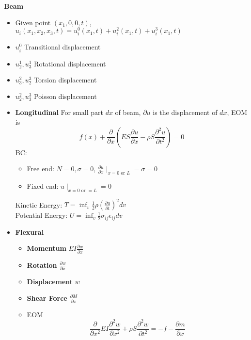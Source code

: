 \documentclass{article}
\begin{document}
\begin{multicols*}{2}
  \noindent\textbf{Beam}
  \begin{itemize}
  \item Given point $(x_1, 0, 0, t)$, $u_i(x_1, x_2, x_3, t) = u_i^0(x_1,t) + u_i^2(x_1,t) + u_i^3(x_1,t)$
  \item $u_i^0$ Transitional displacement
  \item $u_2^1, u_3^1$ Rotational displacement
  \item $u_3^2, u_2^3$ Torsion displacement
  \item $u_2^2, u_3^3$ Poisson displacement
  \item \textbf{Longitudinal} For small part $dx$ of beam, $\partial u$ is the displacement of $dx$, EOM is
    \begin{equation*}
      f(x) + \frac{\partial}{\partial x}(ES\frac{\partial u}{\partial x} -\rho S\frac{\partial^2 u}{\partial t^2}) = 0
    \end{equation*}
    BC:
    \begin{itemize}
    \item Free end: $N=0, \sigma=0$, $\frac{\partial u}{\partial x}\mid_{x=0 \text{ or } L} = \sigma = 0$
    \item Fixed end: $u\mid_{x=0 \text{ or } = L} = 0$
    \end{itemize}
    Kinetic Energy: $T = \inf_v \frac{1}{2} \rho (\frac{\partial u}{\partial t})^2 dv$\\
    Potential Energy: $U = \inf_v \frac{1}{2}\sigma_{ij} \epsilon_{ij} dv$

  \item\textbf{Flexural}
    \begin{itemize}
    \item \textbf{Momentum} $EI\frac{\partial w}{\partial x}$
    \item \textbf{Rotation} $\frac{\partial w}{\partial x}$
    \item \textbf{Displacement} $w$
    \item \textbf{Shear Force} $\frac{\partial M}{\partial x}$
    \item EOM
      \begin{equation*}
        \frac{\partial}{\partial x^2} EI\frac{\partial^2 w}{\partial x^2} + \rho S \frac{\partial^2 w}{\partial t^2} = -f - \frac{\partial m}{\partial x}
      \end{equation*}
    \end{itemize}



\end{itemize}
\end{multicols*}
\end{document}
